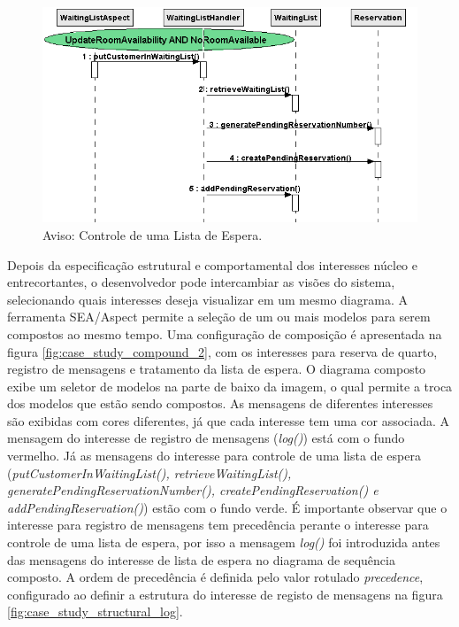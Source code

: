   \begin{figure}
	\centering
	\includegraphics{img/case_study_behavioral_waiting_list.png}
	\caption{Aviso: Controle de uma Lista de Espera.}\label{fig:case_study_behavioral_waiting_list}
  \end{figure}
  
Depois da especificação estrutural e comportamental dos interesses núcleo e entrecortantes, o desenvolvedor pode intercambiar as visões do sistema,
selecionando quais interesses deseja visualizar em um mesmo diagrama. A ferramenta SEA/Aspect permite a seleção de um ou mais modelos para serem
compostos ao mesmo tempo. Uma configuração de composição é apresentada na figura \ref{fig:case_study_compound_2}, com os interesses para reserva de
quarto, registro de mensagens e tratamento da lista de espera. O diagrama composto exibe um seletor de modelos na parte de baixo da imagem, o qual 
permite a troca dos modelos que estão sendo compostos. As mensagens de diferentes
interesses são exibidas com cores diferentes, já que cada interesse tem uma cor associada. A mensagem do interesse de registro de mensagens
(\textit{log()}) está com o fundo vermelho. Já as mensagens do interesse para controle de uma lista de espera (\textit{putCustomerInWaitingList(),
retrieveWaitingList(), generatePendingReservationNumber(), createPendingReservation() e addPendingReservation()}) estão com o fundo verde. É
importante observar que o interesse para registro de mensagens tem precedência perante o interesse para controle de uma lista de espera, por isso a
mensagem \textit{log()} foi introduzida antes das mensagens do interesse de lista de espera no diagrama de sequência composto. A ordem de
precedência é definida pelo valor rotulado \textit{precedence}, configurado ao definir a estrutura do interesse de registo de mensagens na figura
\ref{fig:case_study_structural_log}.

